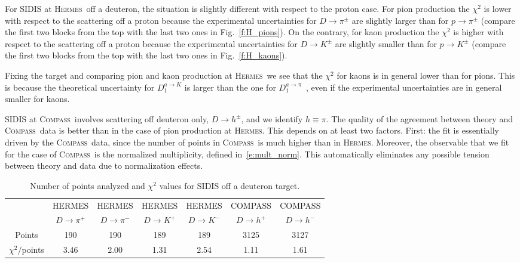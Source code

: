 \documentclass[aps,preprintnumbers,showpacs,nofootinbib,superscriptaddress,floatfix]{revtex4}
\newcommand{\hermes}{\textsc{Hermes}}
\newcommand{\compass}{\textsc{Compass}}
\begin{document}
For SIDIS at \hermes\ off a deuteron, the situation is slightly different with respect to the proton case.
For pion production the $\chi^2$ is lower with respect to the scattering off a proton because the experimental uncertainties for $D \to \pi^\pm$ are slightly larger than for $p \to \pi^\pm$ (compare the first two blocks from the top with the last two ones in Fig.~\ref{f:H_pions}).
On the contrary, for kaon production the $\chi^2$ is higher with respect to the scattering off a proton because the experimental uncertainties for $D \to K^\pm$ are slightly smaller than for $p \to K^\pm$ (compare the first two blocks from the top with the last two ones in Fig.~\ref{f:H_kaons}).

Fixing the target and comparing pion and kaon production at \hermes\, we see that the $\chi^2$ for kaons is in general lower than for pions. This is because the theoretical uncertainty for $D_1^{a \to K}$ is larger than the one for $D_1^{a \to \pi}$~\cite{Epele:2012vg,Signori:2013mda}, even if the experimental uncertainties are in general smaller for kaons.

SIDIS at \compass\ involves scattering off deuteron only, $D \to h^\pm$, and we identify $h \equiv \pi$. 
The quality of the agreement between theory and \compass\ data is better than in the case of pion production at \hermes. This depends on at least two factors. First: the fit is essentially driven by the \compass\ data, since the number of points in \compass\ is much higher than in \hermes. Moreover, the observable that we fit for the case of \compass\ is the normalized multiplicity, defined in~\eqref{e:mult_norm}. This automatically eliminates any possible tension between theory and data due to normalization effects.
\begin{table}[h!]
\begin{center}
\begin{tabular}{|c|c|c|c|c|c|c|}
 \hline
\hline
  & HERMES & HERMES & HERMES & HERMES & COMPASS & COMPASS\\
 ~          &  $D \to \pi^+$    &   $D \to \pi^-$    &  $D \to K^+$    &   $D \to K^-$      &  $D \to h^+$    &   $D \to h^-$            \\
\hline
 Points         &  190 & 190 & 189 & 189   & 3125 & 3127   \\
 \hline
$\chi^2 /$points &3.46 & 2.00 & 1.31 & 2.54  & 1.11 & 1.61 \\            
 \hline
 \hline
\end{tabular}
\caption{Number of points analyzed and $\chi^2$ values for SIDIS off a deuteron target.} 
\label{t:fl_ind_chi2_eD}
\end{center}
\end{table}
\end{document}
